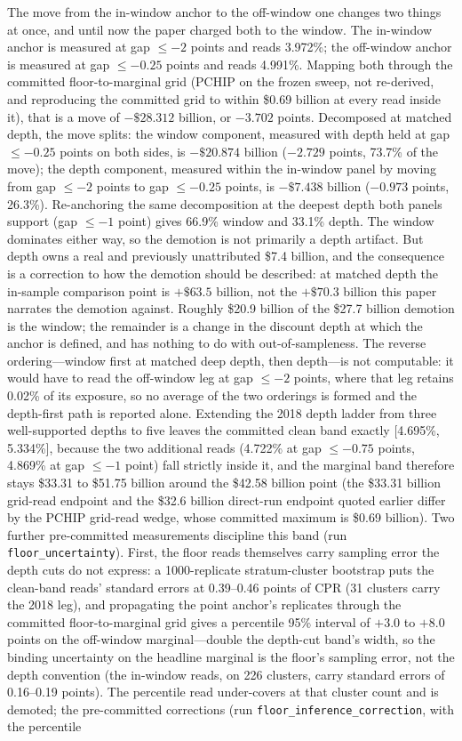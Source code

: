 \documentclass[12pt]{article}
\begin{document}
The move from the in-window anchor to the off-window one changes two things at once, and until now the paper charged both to the window. The in-window anchor is measured at gap $\leq -2$ points and reads 3.972\%; the off-window anchor is measured at gap $\leq -0.25$ points and reads 4.991\%. Mapping both through the committed floor-to-marginal grid (PCHIP on the frozen sweep, not re-derived, and reproducing the committed grid to within \$0.69 billion at every read inside it), that is a move of $-\$28.312$ billion, or $-3.702$ points. Decomposed at matched depth, the move splits: the window component, measured with depth held at gap $\leq -0.25$ points on both sides, is $-\$20.874$ billion ($-2.729$ points, 73.7\% of the move); the depth component, measured within the in-window panel by moving from gap $\leq -2$ points to gap $\leq -0.25$ points, is $-\$7.438$ billion ($-0.973$ points, 26.3\%). Re-anchoring the same decomposition at the deepest depth both panels support (gap $\leq -1$ point) gives 66.9\% window and 33.1\% depth. The window dominates either way, so the demotion is not primarily a depth artifact. But depth owns a real and previously unattributed \$7.4 billion, and the consequence is a correction to how the demotion should be described: at matched depth the in-sample comparison point is $+\$63.5$ billion, not the $+\$70.3$ billion this paper narrates the demotion against. Roughly \$20.9 billion of the \$27.7 billion demotion is the window; the remainder is a change in the discount depth at which the anchor is defined, and has nothing to do with out-of-sampleness. The reverse ordering---window first at matched deep depth, then depth---is not computable: it would have to read the off-window leg at gap $\leq -2$ points, where that leg retains 0.02\% of its exposure, so no average of the two orderings is formed and the depth-first path is reported alone. Extending the 2018 depth ladder from three well-supported depths to five leaves the committed clean band exactly [4.695\%, 5.334\%], because the two additional reads (4.722\% at gap $\leq -0.75$ points, 4.869\% at gap $\leq -1$ point) fall strictly inside it, and the marginal band therefore stays \$33.31 to \$51.75 billion around the \$42.58 billion point (the \$33.31 billion grid-read endpoint and the \$32.6 billion direct-run endpoint quoted earlier differ by the PCHIP grid-read wedge, whose committed maximum is \$0.69 billion). Two further pre-committed measurements discipline this band (run \texttt{floor\_uncertainty}). First, the floor reads themselves carry sampling error the depth cuts do not express: a 1000-replicate stratum-cluster bootstrap puts the clean-band reads' standard errors at 0.39--0.46 points of CPR (31 clusters carry the 2018 leg), and propagating the point anchor's replicates through the committed floor-to-marginal grid gives a percentile 95\% interval of $+3.0$ to $+8.0$ points on the off-window marginal---double the depth-cut band's width, so the binding uncertainty on the headline marginal is the floor's sampling error, not the depth convention (the in-window reads, on 226 clusters, carry standard errors of 0.16--0.19 points). The percentile read under-covers at that cluster count and is demoted; the pre-committed corrections (run \texttt{floor\_inference\_correction}, with the percentile 
\end{document}
